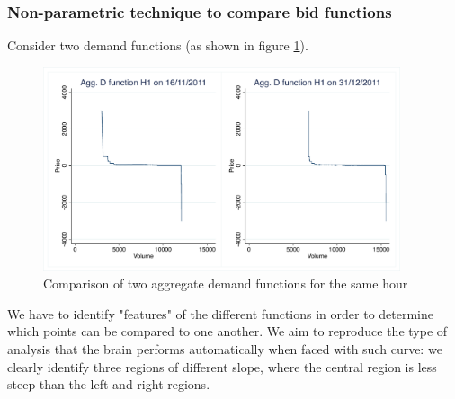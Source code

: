 \subsubsection{Non-parametric technique to compare bid functions}
\label{comparablepoints}
Consider two demand functions (as shown in figure \ref{comparedfunc}). 
\begin{figure}[!ht]
\centering
\includegraphics[trim=0.1cm 0.1cm 0.1cm 0.1cm, clip=true, height= 60mm]{figch2/compare2d.pdf}
\caption{Comparison of two aggregate demand functions for the same hour}
\label{comparedfunc}
\end{figure}
 We have to identify "features" of the different functions in order to determine which points can be compared to one another. We aim to reproduce the type of analysis that the brain performs automatically when faced with such curve: we clearly identify three regions of different slope, where the central region is less steep than the left and right regions. \\

